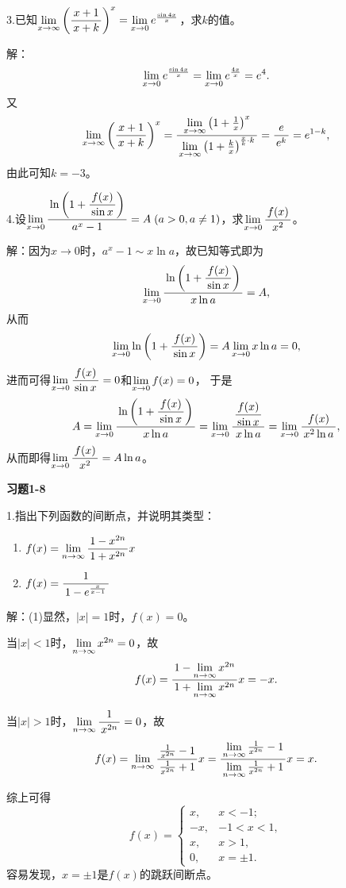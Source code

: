 \bs
3.已知$\limx{\infty}\left(\df{x+1}{x+k}\right)^x
=\limx0e^{\frac{\sin 4x}x}$，求$k$的值。

解：
$$\limx0e^{\frac{\sin 4x}x}
=\limx0e^{\frac{4x}x}=e^4.$$
又
$$
	\limx{\infty}\left(\df{x+1}{x+k}\right)^x
	=\df{\limx{\infty}\left(1+\frac1x\right)^x}
	{\limx{\infty}\left(1+\frac kx\right)^{\frac xk\cdot k}}
	=\df{e}{e^k}=e^{1-k},
$$
由此可知$k=-3$。\fin
	
\bs
4.设$\limx0\df{\ln\left(1+\df{f(x)}{\sin x}\right)}
{a^x-1}=A\;(a>0,a\ne 1)$，求$\limx0\df{f(x)}{x^2}$。

解：因为$x\to 0$时，$a^x-1\sim x\ln a$，故已知等式即为
$$\limx0\df{\ln\left(1+\df{f(x)}{\sin x}\right)}
{x\ln a}=A,$$
从而
$$\limx0\ln\left(1+\df{f(x)}{\sin x}\right)
=A\limx0x\ln a=0,$$
进而可得$\limx0\df{f(x)}{\sin x}=0$和$\limx0f(x)=0$，
于是
$$A=\limx0\df{\ln\left(1+\df{f(x)}{\sin x}\right)}
{x\ln a}
=\limx0\df{\df{f(x)}{\sin x}}{x\ln a}=\limx0\df{f(x)}{x^2\ln a},$$
从而即得$\limx0\df{f(x)}{x^2}=A\ln a$。\fin

\bs
\begin{center}
	\bf 习题1-8
\end{center}

1.指出下列函数的间断点，并说明其类型：
\begin{enumerate}[(1)]
	\setlength{\itemindent}{1cm}
	\item $f(x)=\limn\df{1-x^{2n}}{1+x^{2n}}x$
	\item $f(x)=\df1{1-e^{\frac{x}{x-1}}}$
\end{enumerate}

解：(1)显然，$|x|=1$时，$f(x)=0$。

当$|x|<1$时，$\limn x^{2n}=0$，故
$$f(x)=\df{1-\limn x^{2n}}{1+\limn x^{2n}}x=-x.$$

当$|x|>1$时，$\limn\df1{x^{2n}}=0$，故
$$f(x)=\limn\df{\frac1{x^{2n}}-1}{\frac1{x^{2n}}+1}x
=\df{\limn\frac1{x^{2n}}-1}{\limn\frac1{x^{2n}}+1}x=x.$$

综上可得
$$
	f(x)=\left\{\begin{array}{ll}
		x,& x<-1;\\
		-x, & -1<x<1, \\
		x, & x>1,\\	
		0, & x=\pm1.	
	\end{array}\right.
$$
容易发现，$x=\pm1$是$f(x)$的跳跃间断点。

